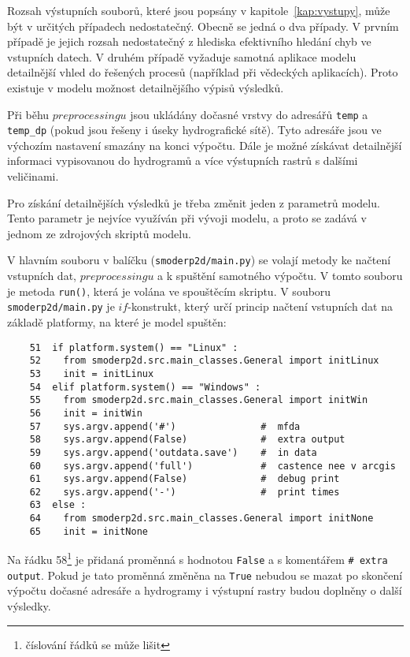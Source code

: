 


Rozsah výstupních souborů, které jsou popsány v kapitole~\ref{kap:vystupy}, může být v určitých případech nedostatečný. Obecně se jedná o dva případy. V prvním případě je jejich rozsah nedostatečný z hlediska efektivního hledání chyb ve vstupních datech. V druhém případě vyžaduje samotná aplikace modelu  detailnější vhled do řešených procesů (například při vědeckých aplikacích). Proto existuje v modelu \smod možnost detailnějšího výpisů výsledků. 

Při běhu $preprocessingu$ jsou ukládány dočasné vrstvy do adresářů {\tt temp} a {\tt temp\_dp} (pokud jsou řešeny i úseky hydrografické sítě). Tyto adresáře jsou ve výchozím nastavení smazány na konci výpočtu. Dále je možné získávat detailnější informaci vypisovanou do hydrogramů a více výstupních rastrů s dalšími veličinami.

Pro získání detailnějších výsledků je třeba změnit jeden z parametrů modelu. Tento parametr je nejvíce využíván při vývoji modelu, a proto se zadává v jednom ze zdrojových skriptů modelu. 

V hlavním souboru v balíčku \smod ({\tt smoderp2d/main.py}) se volají metody ke načtení vstupních dat, $preprocessingu$ a k spuštění samotného výpočtu. V tomto souboru je metoda {\tt run()}, která je volána ve spouštěcím skriptu. V souboru {\tt smoderp2d/main.py} je $if$-konstrukt, který určí princip načtení vstupních dat na základě platformy, na které je model spuštěn:

    \begin{lstlisting}
    51  if platform.system() == "Linux" :
    52    from smoderp2d.src.main_classes.General import initLinux
    53    init = initLinux
    54  elif platform.system() == "Windows" :
    55    from smoderp2d.src.main_classes.General import initWin
    56    init = initWin
    57    sys.argv.append('#')               #  mfda
    58    sys.argv.append(False)             #  extra output
    59    sys.argv.append('outdata.save')    #  in data
    60    sys.argv.append('full')            #  castence nee v arcgis
    61    sys.argv.append(False)             #  debug print
    62    sys.argv.append('-')               #  print times
    63  else :
    64    from smoderp2d.src.main_classes.General import initNone
    65    init = initNone
    \end{lstlisting}
%     
Na řádku 58\footnote{číslování řádků se může lišit} je přidaná proměnná s hodnotou {\tt False} a s komentářem {\tt \#  extra output}. Pokud je tato proměnná změněna na {\tt True} nebudou se mazat po skončení výpočtu dočasné adresáře a hydrogramy i výstupní rastry budou doplněny o další výsledky. 




    
    